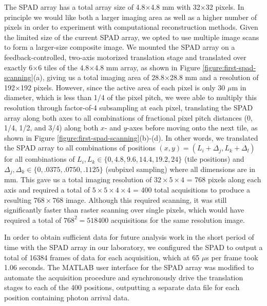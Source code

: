 The SPAD array has a total array size of 4.8$\times$4.8 mm with 32$\times$32 pixels. In principle we would like both a larger imaging area as well as a higher number of pixels in order to experiment with computational reconstruction methods. Given the limited size of the current SPAD array, we opted to use multiple image scans to form a larger-size composite image. We mounted the SPAD array on a feedback-controlled, two-axis motorized translation stage and translated over exactly 6$\times$6 tiles of the 4.8$\times$4.8 mm array, as shown in Figure \ref{figure:first-spad-scanning}(a), giving us a total imaging area of 28.8$\times$28.8 mm and a resolution of 192$\times$192 pixels. However, since the active area of each pixel is only 30 $\mu$m in diameter, which is less than 1/4 of the pixel pitch, we were able to multiply this resolution through factor-of-4 subsampling at each pixel, translating the SPAD array along both axes to all combinations of fractional pixel pitch distances (0, 1/4, 1/2, and 3/4) along both $x$- and $y$-axes before moving onto the next tile, as shown in Figure \ref{figure:first-spad-scanning}(b)-(d). In other words, we translated the SPAD array to all combinations of positions $(x, y) = (L_i + \Delta_j, L_k + \Delta_l)$ for all combinations of $L_i, L_k \in \{ 0, 4.8, 9.6, 14.4, 19.2, 24\}$ (tile positions) and $\Delta_j, \Delta_k \in \{ 0, .0375, .0750, .1125\}$ (subpixel sampling) where all dimensions are in mm. This gave us a total imaging resolution of $32 \times 5 \times 4$ = $768$ pixels along each axis and required a total of $5 \times 5 \times 4 \times 4$ = 400 total acquisitions to produce a resulting $768\times 768$ image. Although this required scanning, it was still significantly faster than raster scanning over single pixels, which would have required a total of $768^2 = 518400$ acquisitions for the same resolution image.

In order to obtain sufficient data for future analysis work in the short period of time with the SPAD array in our laboratory, we configured the SPAD to output a total of 16384 frames of data for each acquisition, which at 65 $\mu$s per frame took 1.06 seconds. The MATLAB user interface for the SPAD array was modified to automate the acquisition procedure and synchronously drive the translation stages to each of the 400 positions, outputting a separate data file for each position containing photon arrival data.

